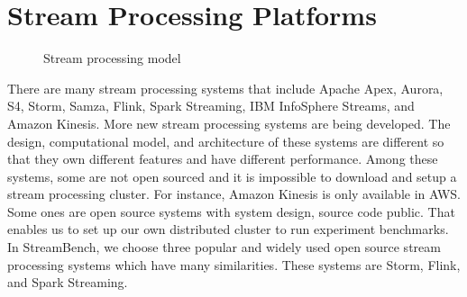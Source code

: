 
\chapter{Stream Processing Platforms}
\label{chapter:platform}

\begin{figure}
  \begin{center}
   \caption{Stream processing model}
   \label{fig:stream_process_model}
  \end{center}
\end{figure}

There are many stream processing systems that include Apache Apex, Aurora, S4, Storm, Samza, Flink, Spark Streaming, IBM InfoSphere Streams, and Amazon Kinesis. More new stream processing systems are being developed. The design, computational model, and architecture of these systems are different so that they own different features and have different performance. Among these systems, some are not open sourced and it is impossible to download and setup a stream processing cluster. For instance, Amazon Kinesis is only available in AWS. Some ones are open source systems with system design, source code public. That enables us to set up our own distributed cluster to run experiment benchmarks. In StreamBench, we choose three popular and widely used open source stream processing systems which have many similarities. These systems are Storm, Flink, and Spark Streaming. 


